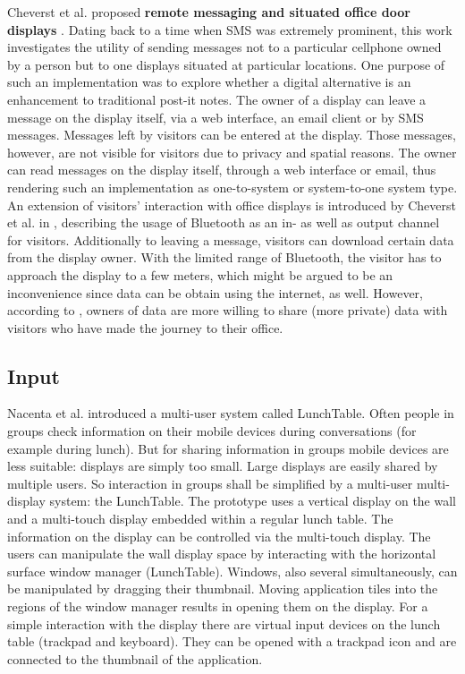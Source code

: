 Cheverst et al. proposed \textbf{remote messaging and situated office door displays} \cite{cheverst2003exploring}.
Dating back to a time when SMS was extremely prominent, this work investigates the utility of sending messages not to a particular cellphone owned by a person but to one displays situated at particular locations.
One purpose of such an implementation was to explore whether a digital alternative is an enhancement to traditional post-it notes.
The owner of a display can leave a message on the display itself, via a web interface, an email client or by SMS messages.
Messages left by visitors can be entered at the display.
Those messages, however, are not visible for visitors due to privacy and spatial reasons.
The owner can read messages on the display itself, through a web interface or email, thus rendering such an implementation as one-to-system or system-to-one system type.
An extension of visitors’ interaction with office displays is introduced by Cheverst et al. in \cite{cheverst2005exploring}, describing the usage of Bluetooth as an in- as well as output channel for visitors.
Additionally to leaving a message, visitors can download certain data from the display owner.
With the limited range of Bluetooth, the visitor has to approach the display to a few meters, which might be argued to be an inconvenience since data can be obtain using the internet, as well.
However, according to \cite{cheverst2005exploring}, owners of data are more willing to share (more private) data with visitors who have made the journey to their office.

\subsection{Input}
Nacenta et al. \cite{a18-nacenta} introduced a multi-user system called LunchTable.
Often people in groups check information on their mobile devices during conversations (for example during lunch). But for sharing information in groups mobile devices are less suitable: displays are simply too small.
Large displays are easily shared by multiple users. So interaction in groups shall be simplified by a multi-user multi-display system: the LunchTable.
The prototype uses a vertical display on the wall and a multi-touch display embedded within a regular lunch table.
The information on the display can be controlled via the multi-touch display.
The users can manipulate the wall display space by interacting with the horizontal surface window manager (LunchTable).
Windows, also several simultaneously, can be manipulated by dragging their thumbnail. Moving application tiles into the regions of the window manager results in opening them on the display.
For a simple interaction with the display there are virtual input devices on the lunch table (trackpad and keyboard).
They can be opened with a trackpad icon and are connected to the thumbnail of the application.

